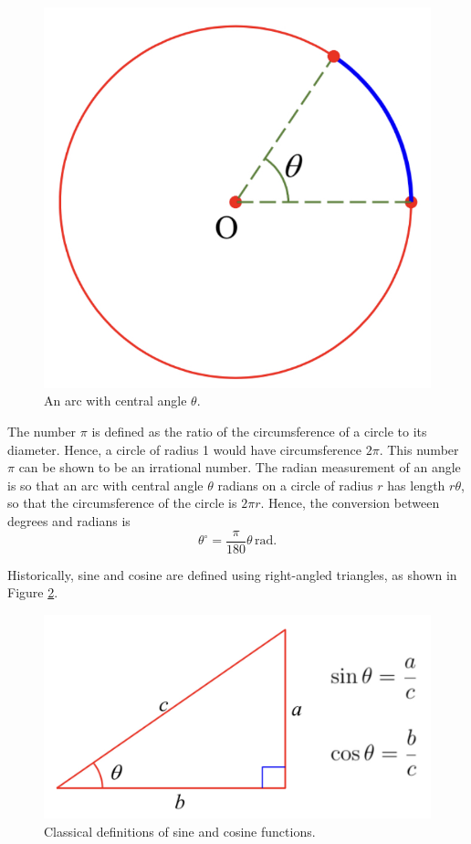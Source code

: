 \begin{figure}[ht]
\centering
\includegraphics[scale=0.2]{Picture29.png}
\caption{An arc with central angle $\theta$.\fa}\label{figure29}
\end{figure}
The number $\pi$ is defined as the ratio of the circumsference of a circle to its diameter. Hence, a circle of radius 1 would have circumsference $2\pi$. This  number $\pi$ can be shown to be an irrational number. The radian measurement of an angle is so   that an arc with central angle $\theta$ radians on a circle of radius $r$ has length $r\theta$, so that the circumsference of the circle is $2\pi r$. Hence, the conversion between degrees and radians is
\[\theta^{\circ} =\frac{\pi}{180}\theta \,\text{rad}.\]



Historically, sine and cosine are defined using right-angled triangles, as shown in Figure \ref{figure30}.
\begin{figure}[ht]
\centering
\includegraphics[scale=0.2]{Picture30.png}
\caption{Classical definitions of sine and cosine functions.\fa}\label{figure30}
\end{figure}

